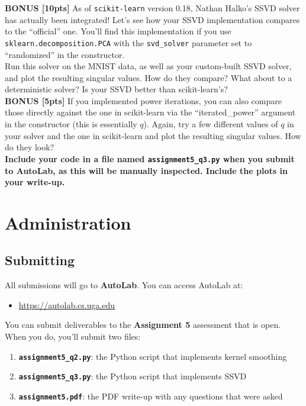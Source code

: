 \documentclass[paper=a4, fontsize=11pt]{scrartcl} %
\numberwithin{figure}{section} %
\numberwithin{table}{section} %
\begin{document}
\textbf{BONUS [10pts]} As of \texttt{scikit-learn} version 0.18, Nathan Halko's SSVD solver has actually been integrated! Let's see how your SSVD implementation compares to the ``official'' one. You'll find this implementation if you use \texttt{sklearn.decomposition.PCA} with the \texttt{svd\_solver} parameter set to ``randomized'' in the constructor. \\

Run this solver on the MNIST data, as well as your custom-built SSVD solver, and plot the resulting singular values. How do they compare? What about to a deterministic solver? Is your SSVD better than scikit-learn's? \\

\textbf{BONUS [5pts]} If you implemented power iterations, you can also compare those directly against the one in scikit-learn via the ``iterated\_power'' argument in the constructor (this is essentially $q$). Again, try a few different values of $q$ in your solver and the one in scikit-learn and plot the resulting singular values. How do they look? \\

\textbf{Include your code in a file named \texttt{assignment5\_q3.py} when you submit to AutoLab, as this will be manually inspected. Include the plots in your write-up.} 

\section*{Administration}
\setcounter{subsection}{0}

\subsection{Submitting}

All submissions will go to \textbf{AutoLab}. You can access AutoLab at:

\begin{itemize}
	\item \url{https://autolab.cs.uga.edu}
\end{itemize}
	
You can submit deliverables to the \textbf{Assignment 5} assessment that is open. When you do, you'll submit two files:

\begin{enumerate}
	\item \texttt{\textbf{assignment5\_q2.py}}: the Python script that implements kernel smoothing
	\item \texttt{\textbf{assignment5\_q3.py}}: the Python script that implements SSVD
	\item \texttt{\textbf{assignment5.pdf}}: the PDF write-up with any questions that were asked
\end{enumerate}
\end{document}
